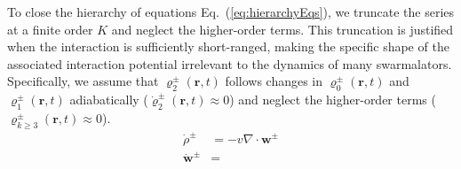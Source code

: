 \documentclass{article}
\begin{document}
To close the hierarchy of equations Eq.~(\ref{eq:hierarchyEqs}), we truncate the series at a finite order $K$ and neglect the higher-order terms. This truncation is justified when the interaction is sufficiently short-ranged, making the specific shape of the associated interaction potential irrelevant to the dynamics of many swarmalators. Specifically, we assume that $\varrho_2^{\pm}\left(\mathbf{r},t\right)$ follows changes in $\varrho_0^{\pm}\left(\mathbf{r},t\right)$ and $\varrho_1^{\pm}\left(\mathbf{r},t\right)$ adiabatically ($\dot{\varrho}_2^{\pm}\left( \mathbf{r},t \right) \approx 0$) and neglect the higher-order terms ($\varrho _{k\geqslant 3}^{\pm}\left( \mathbf{r},t \right) \approx 0$).
\begin{subequations}
    \begin{align}
        \dot{\rho}^{\pm}&=-v\nabla \cdot \mathbf{w}^{\pm}\\
        \dot{\mathbf{w}}^{\pm}&=
    \end{align}
\end{subequations}
\end{document}
